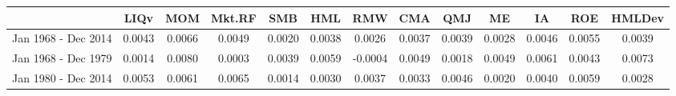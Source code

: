 \begin{tabular}{ccccccccccccc}
	\hline
	& LIQv & MOM & Mkt.RF & SMB & HML & RMW & CMA & QMJ & ME & IA & ROE & HMLDev \\ 
	\hline
 Jan 1968 - Dec 2014 & 0.0043 & 0.0066 & 0.0049 & 0.0020 & 0.0038 & 0.0026 & 0.0037 & 0.0039 & 0.0028 & 0.0046 & 0.0055 & 0.0039 \\ 
	Jan 1968 - Dec 1979 & 0.0014 & 0.0080 & 0.0003 & 0.0039 & 0.0059 & -0.0004 & 0.0049 & 0.0018 & 0.0049 & 0.0061 & 0.0043 & 0.0073 \\ 
	Jan 1980 - Dec 2014 & 0.0053 & 0.0061 & 0.0065 & 0.0014 & 0.0030 & 0.0037 & 0.0033 & 0.0046 & 0.0020 & 0.0040 & 0.0059 & 0.0028 \\ 
	\hline
\end{tabular}